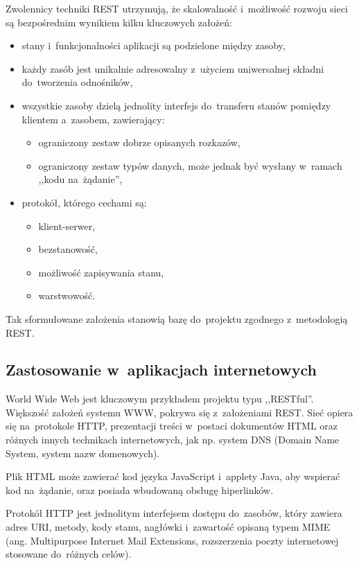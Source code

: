 \documentclass[a4paper,12pt,oneside]{report}
\begin{document}
Zwolennicy techniki REST utrzymują, że skalowalność i~możliwość rozwoju sieci są bezpośrednim wynikiem kilku kluczowych założeń:
\begin{itemize}
  \item stany i~funkcjonalności aplikacji są podzielone między zasoby,
  \item każdy zasób jest unikalnie adresowalny z~użyciem uniwersalnej składni do~tworzenia odnośników,
  \item wszystkie zasoby dzielą jednolity interfejs do~transferu stanów pomiędzy klientem a~zasobem, zawierający:
  \begin{itemize}
    \item ograniczony zestaw dobrze opisanych rozkazów,
    \item ograniczony zestaw typów danych, może jednak być wysłany w~ramach ,,kodu na~żądanie'',
  \end{itemize}
  \item protokół, którego cechami są:
  \begin{itemize}
    \item klient-serwer,
    \item bezstanowość,
    \item możliwość zapisywania stanu,
    \item warstwowość.
  \end{itemize}
\end{itemize}

Tak sformułowane założenia stanowią bazę do~projektu zgodnego z~metodologią REST.
\subsection{Zastosowanie w~aplikacjach internetowych}
\label{rest:web}

World Wide Web jest kluczowym przykładem projektu typu ,,RESTful''. Większość założeń systemu WWW, pokrywa się z~założeniami REST. Sieć opiera się na~protokole HTTP, prezentacji treści w~postaci dokumentów HTML oraz różnych innych technikach internetowych, jak np. system DNS (Domain Name System, system nazw domenowych).

Plik HTML może zawierać kod języka JavaScript i~applety Java, aby wspierać kod na~żądanie, oraz posiada wbudowaną obsługę hiperlinków.

Protokół HTTP jest jednolitym interfejsem dostępu do~zasobów, który zawiera adres URI, metody, kody stanu, nagłówki i~zawartość opisaną typem MIME (ang. Multipurpose Internet Mail Extensions, rozszerzenia poczty internetowej stosowane do~różnych celów).
\end{document}
